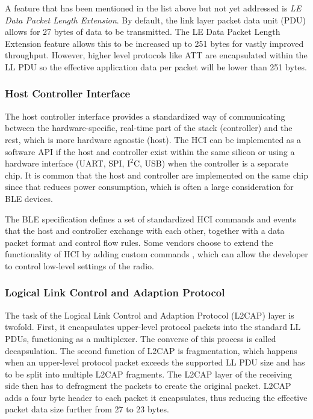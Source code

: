 A feature that has been mentioned in the list above but not yet addressed is \textit{LE Data Packet Length Extension}. By default, the link layer packet data unit (PDU) allows for 27 bytes of data to be transmitted. The LE Data Packet Length Extension feature allows this to be increased up to 251 bytes for vastly improved throughput. However, higher level protocols like ATT are encapsulated within the LL PDU so the effective application data per packet will be lower than 251 bytes.

\subsubsection{Host Controller Interface}
The host controller interface provides a standardized way of communicating between the hardware-specific, real-time part of the stack (controller) and the rest, which is more hardware agnostic (host). The HCI can be implemented as a software API if the host and controller exist within the same silicon or using a hardware interface (UART, SPI, $\text{I}^{2}\text{C}$, USB) when the controller is a separate chip. It is common that the host and controller are implemented on the same chip since that reduces power consumption, which is often a large consideration for BLE devices.

The BLE specification defines a set of standardized HCI commands and events that the host and controller exchange with each other, together with a data packet format and control flow rules\cite{townsend_cufi}. Some vendors choose to extend the functionality of HCI by adding custom commands \cite{ti_ble_dev_guide}, which can allow the developer to control low-level settings of the radio.

\subsubsection{Logical Link Control and Adaption Protocol}
The task of the Logical Link Control and Adaption Protocol (L2CAP) layer is twofold. First, it encapsulates upper-level protocol packets into the standard LL PDUs, functioning as a multiplexer. The converse of this process is called decapsulation. The second function of L2CAP is fragmentation, which happens when an upper-level protocol packet exceeds the supported LL PDU size and has to be split into multiple L2CAP fragments. The L2CAP layer of the receiving side then has to defragment the packets to create the original packet. L2CAP adds a four byte header to each packet it encapsulates, thus reducing the effective packet data size further from 27 to 23 bytes.

